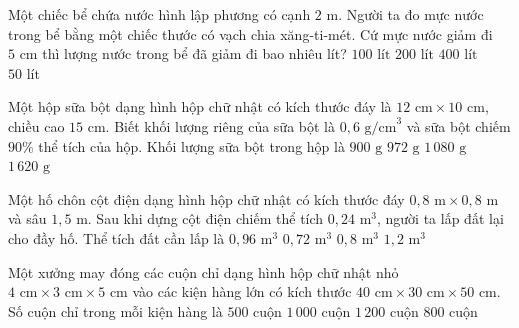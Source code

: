 \begin{ex} %
Một chiếc bể chứa nước hình lập phương có cạnh $2\text{ m}$. Người ta đo mực nước trong bể bằng một chiếc thước có vạch chia xăng-ti-mét. Cứ mực nước giảm đi $5\text{ cm}$ thì lượng nước trong bể đã giảm đi bao nhiêu lít?
\choice
{$100\text{ lít}$}
{\True $200\text{ lít}$}
{$400\text{ lít}$}
{$50\text{ lít}$}
\end{ex}

\begin{ex} %
Một hộp sữa bột dạng hình hộp chữ nhật có kích thước đáy là $12\text{ cm} \times 10\text{ cm}$, chiều cao $15\text{ cm}$. Biết khối lượng riêng của sữa bột là $0{,}6\text{ g/cm}^3$ và sữa bột chiếm $90\%$ thể tích của hộp. Khối lượng sữa bột trong hộp là
\choice
{$900\text{ g}$}
{\True $972\text{ g}$}
{$1\,080\text{ g}$}
{$1\,620\text{ g}$}
\end{ex}

\begin{ex} %
Một hố chôn cột điện dạng hình hộp chữ nhật có kích thước đáy $0{,}8\text{ m} \times 0{,}8\text{ m}$ và sâu $1{,}5\text{ m}$. Sau khi dựng cột điện chiếm thể tích $0{,}24\text{ m}^3$, người ta lấp đất lại cho đầy hố. Thể tích đất cần lấp là
\choice
{$0{,}96\text{ m}^3$}
{\True $0{,}72\text{ m}^3$}
{$0{,}8\text{ m}^3$}
{$1{,}2\text{ m}^3$}
\end{ex}

\begin{ex} %
Một xưởng may đóng các cuộn chỉ dạng hình hộp chữ nhật nhỏ $4\text{ cm} \times 3\text{ cm} \times 5\text{ cm}$ vào các kiện hàng lớn có kích thước $40\text{ cm} \times 30\text{ cm} \times 50\text{ cm}$. Số cuộn chỉ trong mỗi kiện hàng là
\choice
{$500\text{ cuộn}$}
{\True $1\,000\text{ cuộn}$}
{$1\,200\text{ cuộn}$}
{$800\text{ cuộn}$}
\end{ex}

